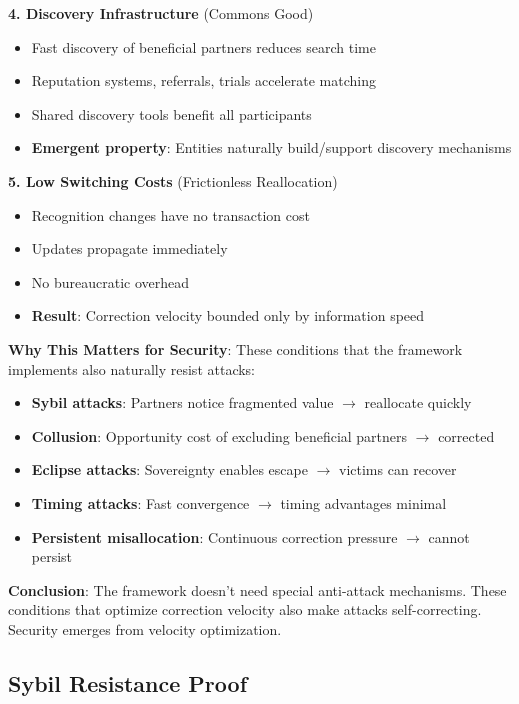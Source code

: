 \documentclass[11pt,a4paper]{article}
\theoremstyle{definition}
\theoremstyle{remark}
\begin{document}
\textbf{4. Discovery Infrastructure} (Commons Good)
\begin{itemize}
\item Fast discovery of beneficial partners reduces search time
\item Reputation systems, referrals, trials accelerate matching
\item Shared discovery tools benefit all participants
\item \textbf{Emergent property}: Entities naturally build/support discovery mechanisms
\end{itemize}

\textbf{5. Low Switching Costs} (Frictionless Reallocation)
\begin{itemize}
\item Recognition changes have no transaction cost
\item Updates propagate immediately
\item No bureaucratic overhead
\item \textbf{Result}: Correction velocity bounded only by information speed
\end{itemize}

\textbf{Why This Matters for Security}: These conditions that the framework implements also naturally resist attacks:
\begin{itemize}
\item \textbf{Sybil attacks}: Partners notice fragmented value $\rightarrow$ reallocate quickly
\item \textbf{Collusion}: Opportunity cost of excluding beneficial partners $\rightarrow$ corrected
\item \textbf{Eclipse attacks}: Sovereignty enables escape $\rightarrow$ victims can recover
\item \textbf{Timing attacks}: Fast convergence $\rightarrow$ timing advantages minimal
\item \textbf{Persistent misallocation}: Continuous correction pressure $\rightarrow$ cannot persist
\end{itemize}

\textbf{Conclusion}: The framework doesn't need special anti-attack mechanisms. These conditions that optimize correction velocity also make attacks self-correcting. Security emerges from velocity optimization.

\subsection{Sybil Resistance Proof}
\end{document}
